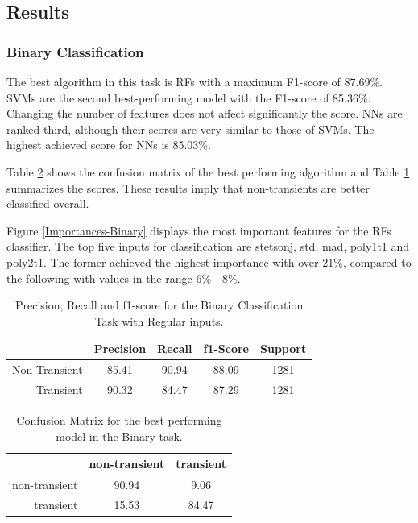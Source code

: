 \documentclass[a4paper,fleqn,usenatbib]{mnras}
\begin{document}
\subsection{Results}

\subsubsection{Binary Classification} 
\label{Results-Binary} 


The best algorithm in this task is RFs with a maximum F1-score of
87.69\%.   
SVMs are the second best-performing model with the F1-score of 85.36\%. 
Changing the number of features does not affect significantly the score.
NNs are ranked third, although their scores are very similar to those of SVMs. 
The highest achieved score for NNs is 85.03\%.


Table \ref{Confusion-Binary} shows the confusion matrix of the best
performing algorithm and Table \ref{Overall-Scores-Binary} summarizes
the scores.
These results imply that non-transients are better classified overall.  


Figure \ref{Importances-Binary} displays the most important features
for the RFs classifier.
The top five inputs for classification are stetson\textunderscore j,
std, mad, poly1\textunderscore t1 and poly2\textunderscore t1.  
The former achieved the highest importance with over 21\%, compared to
the following with values in the range 6\% - 8\%. 


\begin{table}
\centering
\begin{tabular}{|r|c|c|c|c|}
\hline
\multicolumn{1}{|l|}{} & Precision & Recall & f1-Score & Support \\ \hline \hline
Non-Transient          & 85.41    & 90.94   & 88.09   & 1281 \\ \hline
Transient              & 90.32       & 84.47      & 87.29      & 1281    \\ \hline
\end{tabular}
\caption{Precision, Recall and f1-score for the Binary Classification Task with Regular inputs.}
\label{Overall-Scores-Binary}
\end{table}

\begin{table}
\centering
\begin{tabular}{|r|c|c|}
\hline
\multicolumn{1}{|l|}{} & non-transient    & transient   \\ \hline \hline
non-transient                & 90.94       & 9.06    \\ \hline
transient                    & 15.53       & 84.47    \\ \hline
\end{tabular}
\caption{Confusion Matrix for the best performing model in the Binary task.}
\label{Confusion-Binary}
\end{table}
\end{document}

